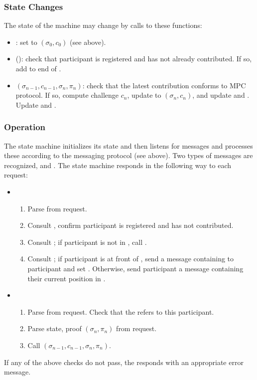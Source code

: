 \subsubsection*{State Changes}
The state of the machine may change by calls to these functions:
\begin{itemize}
    \item \initialize{}: set \MpcState{} to $(\sigma_0, c_0)$ (see above).
    \item \enqueue{}(\ParticipantId{}): check that participant is registered and has not already contributed. If so, add to end of \Queue{}.
    \item \verify{}$(\sigma_{n-1}, c_{n-1}, \sigma_n, \pi_n)$: check that the latest contribution conforms to MPC protocol. If so, compute challenge $c_n$, update \MpcState{} to $(\sigma_n, c_n)$, and update \Transcript{} and \Registry. Update \Queue{} and \TimedLock{}.
\end{itemize}

\subsubsection*{Operation}
The \Coordinator{} state machine initializes its state and then listens for messages and processes these according to the messaging protocol (see above). Two types of messages are recognized, \QueryRequest{} and \UpdateRequest{}. The state machine responds in the following way to each request:
\begin{itemize}
    \item \QueryRequest{}
    \begin{enumerate}
        \item Parse \ParticipantId{} from request. 
        \item Consult \Registry{}, confirm participant is registered and has not contributed. 
        \item Consult \Queue{}; if participant is not in \Queue{}, call \enqueue{}.
        \item Consult \Queue{}; if participant is at front of \Queue{}, send a message containing \MpcState{} to participant and set \TimedLock{}. Otherwise, send participant a message containing their current position in \Queue{}.
    \end{enumerate}
    \item \UpdateRequest{}
    \begin{enumerate}
        \item Parse \ParticipantId{} from request. Check that the \TimedLock{} refers to this participant.
        \item Parse state, proof $(\sigma_n, \pi_n)$ from request. 
        \item Call \verify{}$(\sigma_{n-1}, c_{n-1}, \sigma_n, \pi_n)$.
    \end{enumerate}
\end{itemize}
If any of the above checks do not pass, the \Coordinator{} responds with an appropriate error message.

